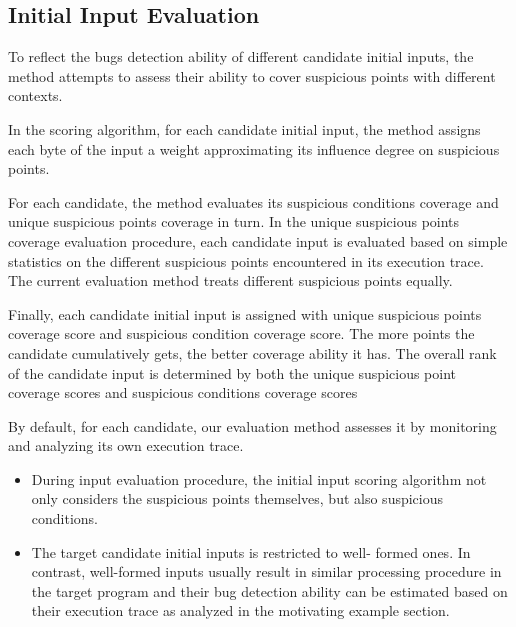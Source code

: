 \subsection{Initial Input Evaluation}
To reflect the bugs detection ability of different candidate initial inputs, the method attempts to assess their ability to cover suspicious points with different contexts.

In the scoring algorithm, for each candidate initial input, the method assigns each byte of the input a weight approximating its influence degree on suspicious points.

For each candidate, the method evaluates its suspicious conditions coverage and unique suspicious points coverage in turn.
In the unique suspicious points coverage evaluation procedure, each candidate input is evaluated based on simple statistics on the different suspicious points encountered in its execution trace. 
The current evaluation method treats different suspicious points equally.

Finally, each candidate initial input is assigned with unique suspicious points coverage score and suspicious condition coverage score.
The more points the candidate cumulatively gets, the better coverage ability it has. 
The overall rank of the candidate input is determined by both the unique suspicious point coverage scores and suspicious conditions coverage scores

By default, for each candidate, our evaluation method assesses it by monitoring and analyzing its own execution trace.
\begin{itemize}
    \item During input evaluation procedure, the initial input scoring algorithm not only considers the suspicious points themselves, but also suspicious conditions.
    \item The target candidate initial inputs is restricted to well- formed ones.
In contrast, well-formed inputs usually result in similar processing procedure in the target program and their bug detection ability can be estimated based on their execution trace as analyzed in the motivating example section.
\end{itemize}


